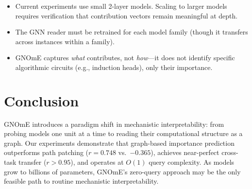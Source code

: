 \documentclass[11pt]{article}
\begin{document}
\begin{itemize}
    \item Current experiments use small 2-layer models. Scaling to larger models requires verification that contribution vectors remain meaningful at depth.
    \item The GNN reader must be retrained for each model family (though it transfers across instances within a family).
    \item GNOmE captures \emph{what} contributes, not \emph{how}---it does not identify specific algorithmic circuits (e.g., induction heads), only their importance.
\end{itemize}

\section{Conclusion}

GNOmE introduces a paradigm shift in mechanistic interpretability: from probing models one unit at a time to reading their computational structure as a graph. Our experiments demonstrate that graph-based importance prediction outperforms path patching ($r = 0.748$ vs.\ $-0.365$), achieves near-perfect cross-task transfer ($r > 0.95$), and operates at $O(1)$ query complexity. As models grow to billions of parameters, GNOmE's zero-query approach may be the only feasible path to routine mechanistic interpretability.



\end{document}
